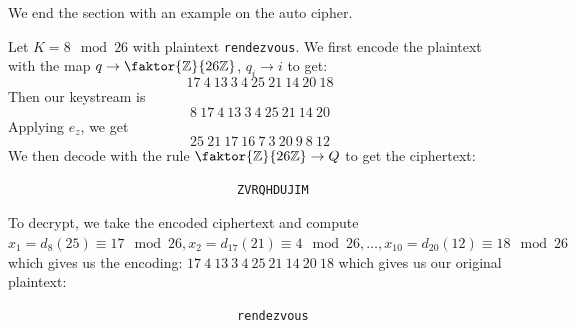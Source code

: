 We end the section with an example on the auto cipher.

\begin{example}
    Let $K=8 \mod{26}$ with plaintext \lstinline{rendezvous}. We first encode
    the plaintext with the map $q \rightarrow \faktor{\Z}{26\Z}$, $q_i
    \rightarrow i$ to get:
    \begin{equation*}
        17 \ 4 \ 13 \ 3 \ 4 \ 25 \ 21 \ 14 \ 20 \ 18
    \end{equation*}
    Then our keystream is
    \begin{equation*}
        8 \ 17 \ 4 \ 13 \ 3 \ 4 \ 25 \ 21 \ 14 \ 20
    \end{equation*}
    Applying $e_z$, we get
    \begin{equation*}
        25 \ 21 \ 17 \ 16 \ 7 \ 3 \ 20 \ 9 \ 8 \ 12
    \end{equation*}
    We then decode with the rule $\faktor{\Z}{26\Z} \rightarrow Q$ to get the
    ciphertext:
        \begin{verbatim}
                                ZVRQHDUJIM
        \end{verbatim}
    To decrypt, we take the encoded ciphertext and compute $x_1=d_8(25) \equiv
    17 \mod{26}, x_2=d_{17}(21) \equiv 4 \mod{26}, \dots, x_{10}=d_{20}(12)
    \equiv 18 \mod{26}$ which gives us the encoding: $17 \ 4 \ 13 \ 3 \ 4 \ 25
    \ 21 \ 14 \ 20 \ 18$ which gives us our original plaintext:
        \begin{verbatim}
                                rendezvous
        \end{verbatim}
\end{example}

